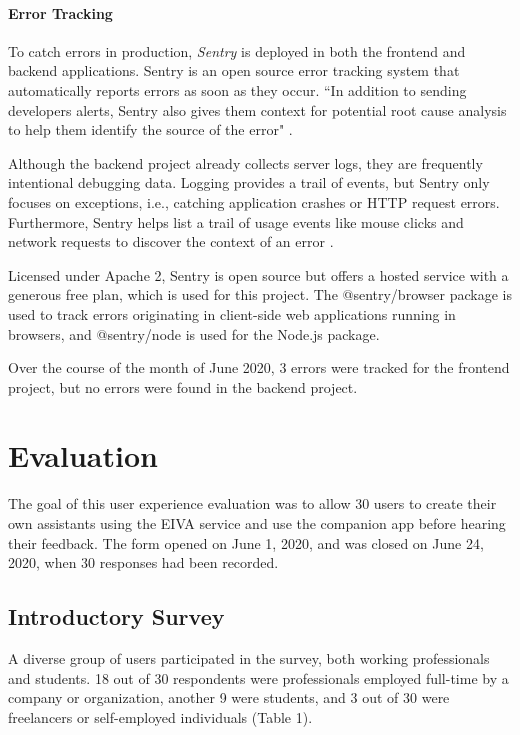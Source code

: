 \documentclass{article}
\begin{document}
\paragraph{Error Tracking}

To catch errors in production, \emph{Sentry} is deployed in both the frontend and backend applications. Sentry is an open source error tracking system \cite{noauthor_sentry_nodate} that automatically reports errors as soon as they occur. ``In addition to sending developers alerts, Sentry also gives them context for potential root cause analysis to help them identify the source of the error" \cite{noauthor_sentry_nodate-1}.

Although the backend project already collects server logs, they are frequently intentional debugging data. Logging provides a trail of events, but Sentry only focuses on exceptions, i.e., catching application crashes or HTTP request errors. Furthermore, Sentry helps list a trail of usage events like mouse clicks and network requests to discover the context of an error \cite{noauthor_sentry_nodate-2}.

Licensed under Apache 2, Sentry is open source but offers a hosted service with a generous free plan, which is used for this project. The @sentry/browser package is used to track errors originating in client-side web applications running in browsers, and @sentry/node is used for the Node.js package.

Over the course of the month of June 2020, 3 errors were tracked for the frontend project, but no errors were found in the backend project.

\newpage

\section{Evaluation}

The goal of this user experience evaluation was to allow 30 users to create their own assistants using the EIVA service and use the companion app before hearing their feedback. The form opened on June 1, 2020, and was closed on June 24, 2020, when 30 responses had been recorded.

\subsection{Introductory Survey}

A diverse group of users participated in the survey, both working professionals and students. 18 out of 30 respondents were professionals employed full-time by a company or organization, another 9 were students, and 3 out of 30 were freelancers or self-employed individuals (Table 1).
\end{document}
